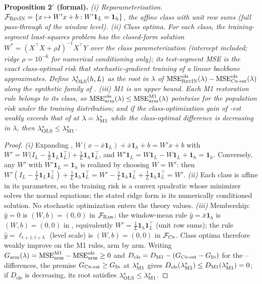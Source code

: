 \medskip\noindent\textbf{Proposition 2$'$ (formal).}
\emph{(i) Reparameterization. $\mathcal{F}_{\textsc{RevIN}} = \{x \mapsto W'x + b : W'\mathbf 1_L = \mathbf 1_h\}$, the affine class with unit row sums (full pass-through of the window level).
(ii) Class optima. For each class, the training-segment least-squares problem has the closed-form solution $W^{*} = (X^\top X + \rho I)^{-1} X^\top Y$ over the class parameterization (intercept included; ridge $\rho = 10^{-6}$ for numerical conditioning only); its test-segment MSE is the exact class-optimal risk that stochastic-gradient training of a linear backbone approximates. Define $\lambda^{*}_{\mathrm{OLS}}(h,L)$ as the root in $\lambda$ of $\mathrm{MSE}^{\mathrm{ols}}_{\textsc{RevIN}}(\lambda) - \mathrm{MSE}^{\mathrm{ols}}_{\textsc{Cn}\text{-est}}(\lambda)$ along the synthetic family of .
(iii) M1 is an upper bound. Each M1 restoration rule belongs to its class, so $\mathrm{MSE}^{\mathrm{ols}}_{\mathrm{arm}}(\lambda) \le \mathrm{MSE}^{\mathrm{M1}}_{\mathrm{arm}}(\lambda)$ pointwise for the population risk under the training distribution; and if the class-optimization gain of \cnm{}-est weakly exceeds that of \inm{} at $\lambda = \lambda^{*}_{\mathrm{M1}}$ while the class-optimal difference is decreasing in $\lambda$, then $\lambda^{*}_{\mathrm{OLS}} \le \lambda^{*}_{\mathrm{M1}}$.}

\begin{proof}
\emph{(i)} Expanding , $W(x - \bar x\mathbf 1_L) + \bar x \mathbf 1_h + b = W'x + b$ with $W' = W\big(I_L - \tfrac1L \mathbf 1_L\mathbf 1_L^\top\big) + \tfrac1L \mathbf 1_h \mathbf 1_L^\top$, and $W'\mathbf 1_L = W\mathbf 1_L - W\mathbf 1_L + \mathbf 1_h = \mathbf 1_h$. Conversely, any $W'$ with $W'\mathbf 1_L = \mathbf 1_h$ is realized by choosing $W = W'$: then $W'(I_L - \tfrac1L \mathbf 1_L\mathbf 1_L^\top) + \tfrac1L\mathbf 1_h\mathbf 1_L^\top = W' - \tfrac1L\mathbf 1_h \mathbf 1_L^\top + \tfrac1L\mathbf 1_h\mathbf 1_L^\top = W'$.
\emph{(ii)} Each class is affine in its parameters, so the training risk is a convex quadratic whose minimizer solves the normal equations; the stated ridge form is its numerically conditioned solution. No stochastic optimization enters the theory values.
\emph{(iii)} Membership: $\hat y = 0$ is $(W,b) = (0,0)$ in $\mathcal{F}_{\textsc{Raw}}$; the window-mean rule $\hat y = \bar x\mathbf 1_h$ is $(W,b) = (0,0)$ in , equivalently $W' = \tfrac1L \mathbf 1_h\mathbf 1_L^\top$ (unit row sums); the \cnm{} rule $\hat y = \ell_{t+1:t+h}$ (level scale) is $(W,b) = (0,0)$ in $\mathcal{F}_{\textsc{Cn}}$. Class optima therefore weakly improve on the M1 rules, arm by arm. Writing $G_{\mathrm{arm}}(\lambda) = \mathrm{MSE}^{\mathrm{M1}}_{\mathrm{arm}} - \mathrm{MSE}^{\mathrm{ols}}_{\mathrm{arm}} \ge 0$ and $D_{\mathrm{ols}} = D_{\mathrm{M1}} - (G_{\textsc{Cn}\text{-est}} - G_{\textsc{In}})$ for the \cnm{}--\inm{} differences, the premise $G_{\textsc{Cn}\text{-est}} \ge G_{\textsc{In}}$ at $\lambda^{*}_{\mathrm{M1}}$ gives $D_{\mathrm{ols}}(\lambda^{*}_{\mathrm{M1}}) \le D_{\mathrm{M1}}(\lambda^{*}_{\mathrm{M1}}) = 0$; if $D_{\mathrm{ols}}$ is decreasing, its root satisfies $\lambda^{*}_{\mathrm{OLS}} \le \lambda^{*}_{\mathrm{M1}}$.
\end{proof}

